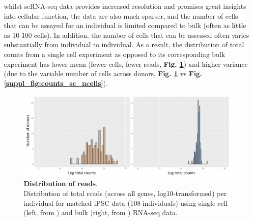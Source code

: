whilst scRNA-seq data provides increased resolution and promises great insights into cellular function, the data are also much sparser, and the number of cells that can be assayed for an individual is limited compared to bulk (often as little as 10-100 cells). 
In addition, the number of cells that can be assessed often varies substantially from individual to individual.
As a result, the distribution of total counts from a single cell experiment as opposed to its corresponding bulk experiment has lower mean (fewer cells, fewer reads, \textbf{Fig. \ref{fig:sc_bulk_counts}}) and higher variance (due to the variable number of cells across donors, \textbf{Fig. \ref{fig:sc_bulk_counts}} vs \textbf{Fig. \ref{suppl_fig:counts_sc_ncells}}).

\begin{figure}[h]
\centering
\includegraphics[width=13cm]{Chapter3/Fig/count_distribution_sc_vs_bulk.png}
\caption[Distribution of reads]{\textbf{Distribution of reads}.\\
Distribution of total reads (across all genes, log10-transformed) per individual for matched 
iPSC
data (108 individuals) using single cell (left, from \cite{cuomo2020single}) and bulk (right, from \cite{mirauta2018population}) RNA-seq data.}
\label{fig:sc_bulk_counts}
\end{figure}


